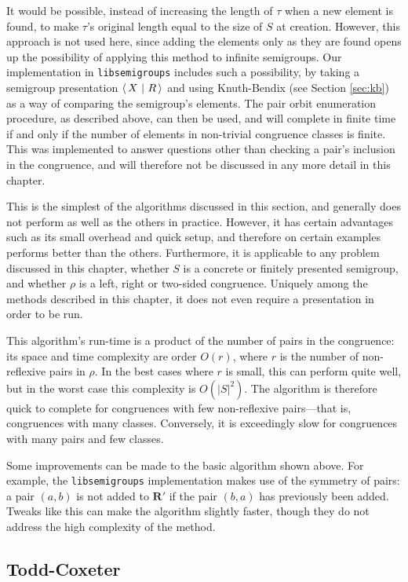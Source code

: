 It would be possible, instead of increasing the length of $\tau$ when a new
element is found, to make $\tau$'s original length equal to the size of $S$ at
creation.  However, this approach is not used here, since adding the elements only as
they are found opens up the possibility of applying this method to infinite
semigroups.  Our implementation in \texttt{libsemigroups} \cite{libsemigroups}
includes such a possibility, by taking a semigroup presentation $\left\langle\,X ~\middle|~ R\,\right\rangle$ and
using Knuth-Bendix (see Section \ref{sec:kb}) as a way of comparing the semigroup's
elements.  The pair orbit enumeration procedure, as described above, can then be
used, and will complete in finite time if and only if the number of elements in
non-trivial congruence classes is finite.  This was implemented to answer
questions other than checking a pair's inclusion in the congruence, and will
therefore not be discussed in any more detail in this chapter.

This is the simplest of the algorithms discussed in this section, and generally
does not perform as well as the others in practice.  However, it has certain
advantages such as its small overhead and quick setup, and therefore on certain
examples performs better than the others.  Furthermore, it is applicable to any
problem discussed in this chapter, whether $S$ is a concrete or finitely
presented semigroup, and whether $\rho$ is a left, right or two-sided
congruence.  Uniquely among the methods described in this chapter, it does not
even require a presentation in order to be run.

This algorithm's run-time is a product of the number of pairs in the congruence:
its space and time complexity are order $O(r)$, where $r$ is the number of
non-reflexive pairs in $\rho$.  In the best cases where $r$ is small, this can
perform quite well, but in the worst case this complexity is $O(|S|^2)$.
The algorithm is therefore quick to complete for congruences with few
non-reflexive pairs---that is, congruences with many classes.  Conversely, it is
exceedingly slow for congruences with many pairs and few classes.

Some improvements can be made to the basic algorithm shown above.  For example,
the \texttt{libsemigroups} implementation makes use of the symmetry of pairs: a
pair $(a,b)$ is not added to $\mathbf{R}'$ if the pair $(b,a)$ has previously
been added.  Tweaks like this can make the algorithm slightly faster, though
they do not address the high complexity of the method.

\subsection{Todd-Coxeter}
\label{sec:tc}

